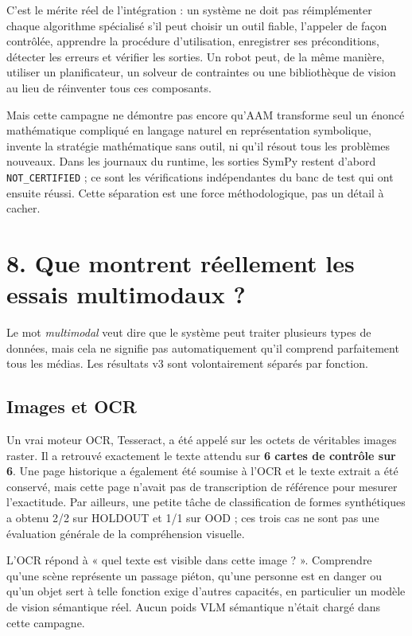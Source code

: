 \documentclass[11pt,a4paper]{article}
\begin{document}
C'est le mérite réel de l'intégration : un système ne doit pas réimplémenter chaque algorithme spécialisé s'il peut choisir un outil fiable, l'appeler de façon contrôlée, apprendre la procédure d'utilisation, enregistrer ses préconditions, détecter les erreurs et vérifier les sorties. Un robot peut, de la même manière, utiliser un planificateur, un solveur de contraintes ou une bibliothèque de vision au lieu de réinventer tous ces composants.

Mais cette campagne ne démontre pas encore qu'AAM transforme seul un énoncé mathématique compliqué en langage naturel en représentation symbolique, invente la stratégie mathématique sans outil, ni qu'il résout tous les problèmes nouveaux. Dans les journaux du runtime, les sorties SymPy restent d'abord \texttt{NOT\_CERTIFIED} ; ce sont les vérifications indépendantes du banc de test qui ont ensuite réussi. Cette séparation est une force méthodologique, pas un détail à cacher.

\section*{8. Que montrent réellement les essais multimodaux ?}

Le mot \emph{multimodal} veut dire que le système peut traiter plusieurs types de données, mais cela ne signifie pas automatiquement qu'il comprend parfaitement tous les médias. Les résultats v3 sont volontairement séparés par fonction.

\subsection*{Images et OCR}

Un vrai moteur OCR, Tesseract, a été appelé sur les octets de véritables images raster. Il a retrouvé exactement le texte attendu sur \textbf{6 cartes de contrôle sur 6}. Une page historique a également été soumise à l'OCR et le texte extrait a été conservé, mais cette page n'avait pas de transcription de référence pour mesurer l'exactitude. Par ailleurs, une petite tâche de classification de formes synthétiques a obtenu 2/2 sur HOLDOUT et 1/1 sur OOD ; ces trois cas ne sont pas une évaluation générale de la compréhension visuelle.

L'OCR répond à « quel texte est visible dans cette image ? ». Comprendre qu'une scène représente un passage piéton, qu'une personne est en danger ou qu'un objet sert à telle fonction exige d'autres capacités, en particulier un modèle de vision sémantique réel. Aucun poids VLM sémantique n'était chargé dans cette campagne.
\end{document}
